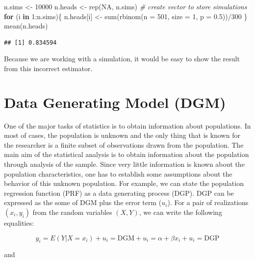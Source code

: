 \documentclass[
]{book}
\newenvironment{Shaded}{\begin{snugshade}}{\end{snugshade}}
\newcommand{\AttributeTok}[1]{\textcolor[rgb]{0.77,0.63,0.00}{#1}}
\newcommand{\CommentTok}[1]{\textcolor[rgb]{0.56,0.35,0.01}{\textit{#1}}}
\newcommand{\ConstantTok}[1]{\textcolor[rgb]{0.00,0.00,0.00}{#1}}
\newcommand{\ControlFlowTok}[1]{\textcolor[rgb]{0.13,0.29,0.53}{\textbf{#1}}}
\newcommand{\DecValTok}[1]{\textcolor[rgb]{0.00,0.00,0.81}{#1}}
\newcommand{\FloatTok}[1]{\textcolor[rgb]{0.00,0.00,0.81}{#1}}
\newcommand{\FunctionTok}[1]{\textcolor[rgb]{0.00,0.00,0.00}{#1}}
\newcommand{\NormalTok}[1]{#1}
\newcommand{\OtherTok}[1]{\textcolor[rgb]{0.56,0.35,0.01}{#1}}
\newcommand{\SpecialCharTok}[1]{\textcolor[rgb]{0.00,0.00,0.00}{#1}}
\begin{document}
\begin{Shaded}
\begin{Highlighting}[]
\NormalTok{n.sims }\OtherTok{\textless{}{-}} \DecValTok{10000}
\NormalTok{n.heads }\OtherTok{\textless{}{-}} \FunctionTok{rep}\NormalTok{(}\ConstantTok{NA}\NormalTok{, n.sims) }\CommentTok{\# create vector to store simulations}
\ControlFlowTok{for}\NormalTok{ (i }\ControlFlowTok{in} \DecValTok{1}\SpecialCharTok{:}\NormalTok{n.sims)\{}
\NormalTok{  n.heads[i] }\OtherTok{\textless{}{-}} \FunctionTok{sum}\NormalTok{(}\FunctionTok{rbinom}\NormalTok{(}\AttributeTok{n =} \DecValTok{501}\NormalTok{, }\AttributeTok{size =} \DecValTok{1}\NormalTok{, }\AttributeTok{p =} \FloatTok{0.5}\NormalTok{))}\SpecialCharTok{/}\DecValTok{300}
\NormalTok{\}}
\FunctionTok{mean}\NormalTok{(n.heads)}
\end{Highlighting}
\end{Shaded}

\begin{verbatim}
## [1] 0.834594
\end{verbatim}

Because we are working with a simulation, it would be easy to show the result from this incorrect estimator.

\hypertarget{data-generating-model-dgm}{%
\section{Data Generating Model (DGM)}\label{data-generating-model-dgm}}

One of the major tasks of statistics is to obtain information about populations. In most of cases, the population is unknown and the only thing that is known for the researcher is a finite subset of observations drawn from the population. The main aim of the statistical analysis is to obtain information about the population through analysis of the sample. Since very little information is known about the population characteristics, one has to establish some assumptions about the behavior of this unknown population. For example, we can state the population regression function (PRF) as a data generating process (DGP). DGP can be expressed as the some of DGM plus the error term (\(u_i\)). For a pair of realizations \((x_i,y_i)\) from the random variables \((X,Y)\), we can write the following equalities:

\[
y_{i}=E\left(Y | X=x_{i}\right)+u_{i}=\text{DGM} + u_{i} = \alpha+\beta x_{i}+u_{i} =\text{DGP}
\]

and
\end{document}
